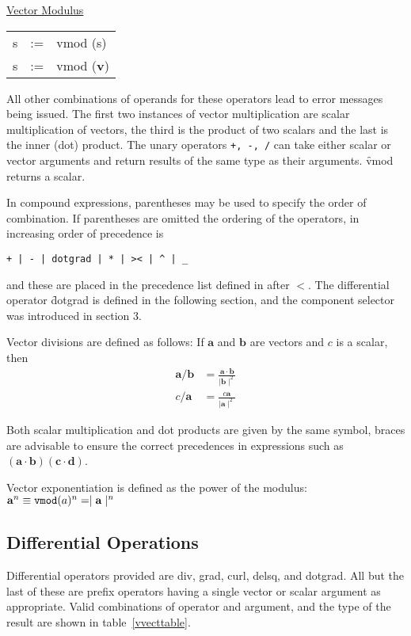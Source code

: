 \underline{Vector Modulus}\\
 
\begin{tabular}{rcl}
   s    &:=& vmod (s)\\
   s    &:=& vmod (\textbf{v}) 
\end{tabular}

All other combinations of operands for these operators lead to error 
messages being issued.  The first two instances of vector
multiplication are scalar multiplication of vectors, the third is the
 
 
product of two scalars and the last is the inner (dot) product.  The
unary operators  \texttt{+, -, /} can take either scalar or vector
arguments and return results of the same type as their arguments. 
\f{vmod} returns a scalar.

In compound expressions, parentheses may be used to specify the order of
combination.  If parentheses are omitted the ordering of the
operators, in increasing order of precedence is
\begin{verbatim}
+ | - | dotgrad | * | >< | ^ | _
\end{verbatim}
and these are placed in the precedence list defined in \REDUCE
after $<$.
The differential operator \f{dotgrad} is defined in the 
\hypertarget{operator:DORGRAD}{}
following section, and the component selector \texttt{\textunderscore} was introduced in
section 3.

Vector divisions are defined as follows:  If $\mathbf{a}$ and $\mathbf{b}$ are
vectors and $c$ is a scalar, then
\begin{align*}
\mathbf{a} /  \mathbf{b} & =   \frac{\mathbf{a} \cdot \mathbf{b}}{  \mid \mathbf{b} 
\mid^2}\\
c / \mathbf{a}   & =   \frac{c \mathbf{a}  }{ \mid \mathbf{a} \mid^2}
\end{align*}

Both scalar multiplication and dot products are given by the same symbol, 
braces are advisable to ensure the correct
precedences in expressions such as $(\mathbf{a} \cdot \mathbf{b}) 
(\mathbf{c} \cdot \mathbf{d})$.

Vector exponentiation is defined as the power of the modulus:\\
$\mathbf{a}^n \equiv  \texttt{vmod}(a)^n =   \mid \mathbf{a} \mid^n$

\subsection{Differential Operations}
Differential operators provided are div, grad, curl, delsq, and dotgrad.
 
 
\hypertarget{operator:DOTGRAD}{}
All but the last of these are prefix operators having a single
vector or scalar argument as appropriate.  Valid combinations of 
operator and argument, and the type of the result are shown in table~\ref{vvecttable}.


